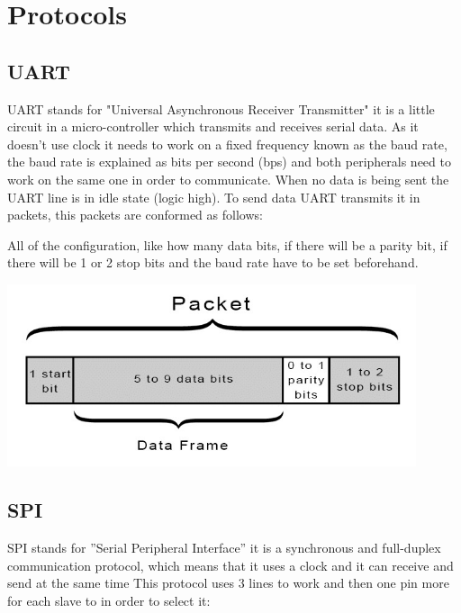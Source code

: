 \documentclass[12pt,a4paper,landscape]{article}
\begin{document}
\section*{Protocols}
	\begin{multicols}{2}
		\subsection*{UART}
		UART stands for "Universal Asynchronous Receiver Transmitter" it is a little circuit in a micro-controller which transmits and receives serial data.
		As it doesn't use clock it needs to work on a fixed frequency known as the baud rate, the baud rate is explained as bits per second (bps) and both peripherals need to work on the same one in order to communicate.
		When no data is being sent the UART line is in idle state (logic high).
		To send data UART transmits it in packets, this packets are conformed as follows:
		
		
		All of the configuration, like how many data bits, if there will be a parity bit, if there will be 1 or 2 stop bits and the baud rate have to be set beforehand.

		\begin{center}
			\includegraphics[width=12cm]{UART_packet.png}
		\end{center}

		\vspace{4cm}

		\subsection*{SPI}
		SPI stands for ”Serial Peripheral Interface” it is a synchronous and full-duplex communication protocol, which means that it uses a clock and it can receive and send at the same time
This protocol uses 3 lines to work and then one pin more for each slave to in order to select it:


\end{multicols}
\end{document}

